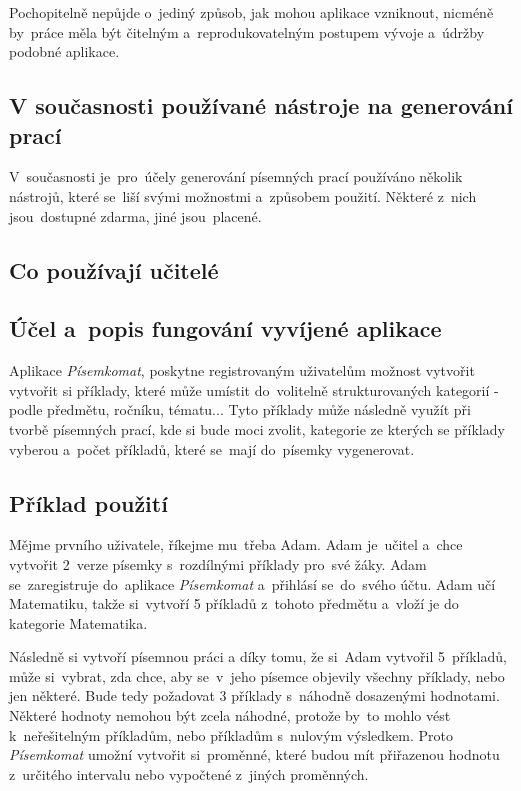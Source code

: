 \documentclass[14pt]{article}
\begin{document}
    Pochopitelně nepůjde o~jediný způsob, jak mohou aplikace vzniknout, nicméně by~práce měla být čitelným a~reprodukovatelným postupem vývoje
    a~údržby podobné aplikace.
        
        \subsection{V současnosti používané nástroje na generování prací}
        V~současnosti je~pro~účely generování písemných prací používáno několik nástrojů, které se~liší svými možnostmi a~způsobem použití.
        Některé z~nich jsou~dostupné zdarma, jiné jsou~placené.
        
        \subsection{Co používají učitelé}

        \subsection{Účel a~popis fungování vyvíjené aplikace}
        Aplikace \emph{Písemkomat}, poskytne registrovaným uživatelům možnost vytvořit vytvořit si příklady, které může umístit do~volitelně
        strukturovaných kategorií - podle předmětu, ročníku, tématu... Tyto příklady může následně využít při tvorbě písemných prací,
        kde si bude moci zvolit, kategorie ze kterých se příklady vyberou a~počet příkladů, které se~mají do~písemky vygenerovat. 
        \subsection{Příklad použití}
        Mějme prvního uživatele, říkejme mu~třeba Adam. Adam je~učitel a~chce vytvořit 2~verze písemky s~rozdílnými příklady pro~své žáky.
        Adam se~zaregistruje do~aplikace \emph{Písemkomat} a~přihlásí se~do~svého účtu. Adam učí Matematiku, takže si~vytvoří 5 příkladů z~tohoto předmětu
        a~vloží je do kategorie Matematika.

        Následně si vytvoří písemnou práci a díky tomu, že si~Adam vytvořil 5~příkladů, může si~vybrat, zda chce,
        aby se~v~jeho písemce objevily všechny příklady, nebo jen některé. Bude tedy požadovat 3 příklady s~náhodně dosazenými hodnotami.
        Některé hodnoty nemohou být zcela náhodné, protože by~to mohlo vést k~neřešitelným příkladům, nebo příkladům s~nulovým výsledkem.
        Proto \emph{Písemkomat} umožní vytvořit si~proměnné, které budou mít přiřazenou hodnotu z~určitého intervalu nebo vypočtené z~jiných proměnných.
\end{document}
